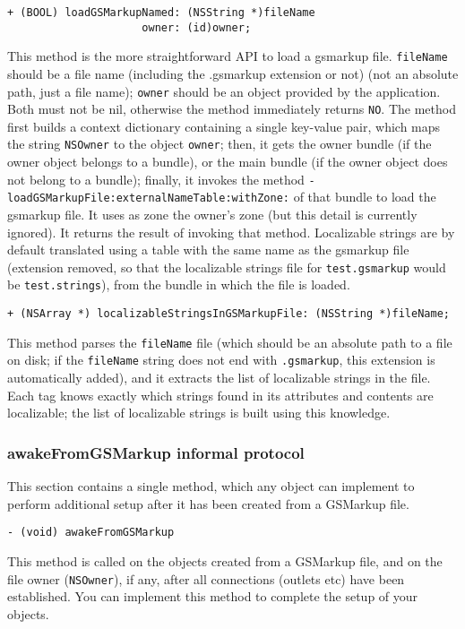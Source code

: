 \begin{verbatim}
+ (BOOL) loadGSMarkupNamed: (NSString *)fileName
                     owner: (id)owner;
\end{verbatim}
This method is the more straightforward API to load a gsmarkup file.
\texttt{fileName} should be a file name (including the .gsmarkup
extension or not) (not an absolute path, just a file name);
\texttt{owner} should be an object provided by the application.  Both
must not be nil, otherwise the method immediately returns \texttt{NO}.
The method first builds a context dictionary containing a single
key-value pair, which maps the string \texttt{NSOwner} to the object
\texttt{owner}; then, it gets the owner bundle (if the owner object
belongs to a bundle), or the main bundle (if the owner object does not
belong to a bundle); finally, it invokes the method
\texttt{-loadGSMarkupFile:externalNameTable:withZone:} of that bundle to load
the gsmarkup file.  It uses as zone the owner's zone (but this detail is
currently ignored).  It returns the result of invoking that method.
Localizable strings are by default translated using a table with the
same name as the gsmarkup file (extension removed, so that the localizable
strings file for \texttt{test.gsmarkup} would be \texttt{test.strings}),
from the bundle in which the file is loaded.

\begin{verbatim}
+ (NSArray *) localizableStringsInGSMarkupFile: (NSString *)fileName;
\end{verbatim}
This method parses the \texttt{fileName} file (which should be an
absolute path to a file on disk; if the \texttt{fileName} string does
not end with \texttt{.gsmarkup}, this extension is automatically added),
and it extracts the list of localizable strings in the file.  Each tag
knows exactly which strings found in its attributes and contents are
localizable; the list of localizable strings is built using this
knowledge.

\subsubsection{awakeFromGSMarkup informal protocol}
This section contains a single method, which any object can implement
to perform additional setup after it has been created from a GSMarkup
file.
\begin{verbatim}
- (void) awakeFromGSMarkup
\end{verbatim}
This method is called on the objects created from a GSMarkup file, and
on the file owner (\texttt{NSOwner}), if any, after all connections
(outlets etc) have been established.  You can implement this method to
complete the setup of your objects.

